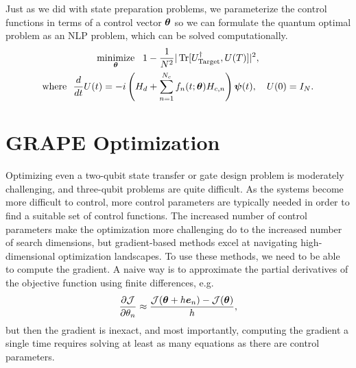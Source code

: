 \documentclass[letterpaper]{tufte-handout}
\begin{document}
Just as we did with state preparation problems, we parameterize the control functions in terms of a control vector $\boldsymbol{\theta}$ so we can formulate the quantum optimal problem as an NLP problem, which can be solved computationally.
\begin{gather}
    \operatorname*{minimize}_{\boldsymbol{\theta}}\ \  1 - \frac{1}{N^2}|\operatorname{Tr}[U_{\textrm{Target}}^\dagger, U(T)]|^2, \label{eq:gate_optimization_problem}\\
    \textrm{where}\ \ \frac{d}{dt}U(t) = -i\left(H_d + \sum_{n=1}^{N_c} f_n(t;\boldsymbol{\theta})H_{c,n}\right)\boldsymbol{\psi}(t),\quad U(0) = I_{N}. \nonumber
\end{gather}
\section{GRAPE Optimization}
Optimizing even a two-qubit state transfer or gate design problem is moderately challenging, and three-qubit problems are quite difficult.  As the systems become more difficult to control, more control parameters are typically needed in order to find a suitable set of control functions. The increased number of control parameters make the optimization more challenging do to the increased number of search dimensions, but gradient-based methods excel at navigating high-dimensional optimization landscapes. To use these methods, we need to be able to compute the gradient. A naive way is to approximate the partial derivatives of the objective function using finite differences, e.g.
\begin{equation*}
    \frac{\partial \mathcal{J}}{\partial \theta_n} \approx \frac{\mathcal{J}(\boldsymbol{\theta} + h \boldsymbol{e}_n) - \mathcal{J}(\boldsymbol{\theta})}{h},
\end{equation*}
but then the gradient is inexact, and most importantly, computing the gradient a single time requires solving at least as many \Schrodinger equations as there are control parameters.
\end{document}
